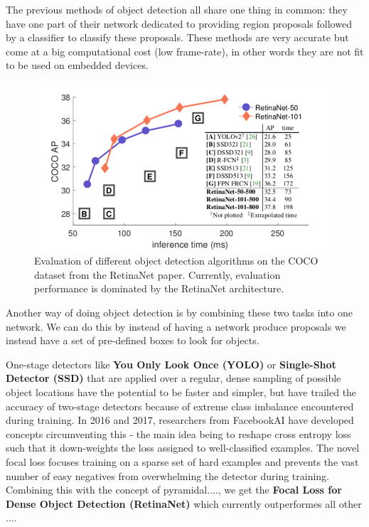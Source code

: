 \documentclass[a4paper]{article}
\begin{document}
The previous methods of object detection all share one thing in common: they have one part of their network dedicated to providing region proposals followed by a classifier to classify these proposals. These methods are very accurate but come at a big computational cost (low frame-rate), in other words they are not fit to be used on embedded devices.
\begin{figure}

\includegraphics[scale=0.32]{images/retinanet}
\caption{Evaluation of different object detection algorithms on the COCO dataset from the RetinaNet paper. Currently, evaluation performance is dominated by the RetinaNet architecture.}
\end{figure}
Another way of doing object detection is by combining these two tasks into one network. We can do this by instead of having a network produce proposals we instead have a set of pre-defined boxes to look for objects.



One-stage detectors like \textbf{You Only Look Once (YOLO)}\cite{DBLP:journals/corr/RedmonDGF15}\cite{DBLP:journals/corr/RedmonF16}\cite{DBLP:journals/corr/abs-1804-02767} or \textbf{Single-Shot Detector (SSD)}\cite{DBLP:journals/corr/LiuAESR15} that are applied over a regular, dense sampling of possible object locations have the potential to be faster and simpler, but have trailed the accuracy of two-stage detectors because of extreme class imbalance encountered during training.
In 2016 and 2017, researchers from FacebookAI have developed concepts \cite{DBLP:journals/corr/abs-1708-02002}\cite{DBLP:journals/corr/LinDGHHB16}circumventing this - the main idea being to reshape cross entropy loss such that it down-weights the loss assigned to well-classified examples. The novel focal loss focuses training on a sparse set of hard examples and prevents the vast number of easy negatives from overwhelming the detector during training. Combining this with the concept of pyramidal...., we get the \textbf{Focal Loss for Dense Object Detection (RetinaNet)} which currently outperformes all other ....
\end{document}
